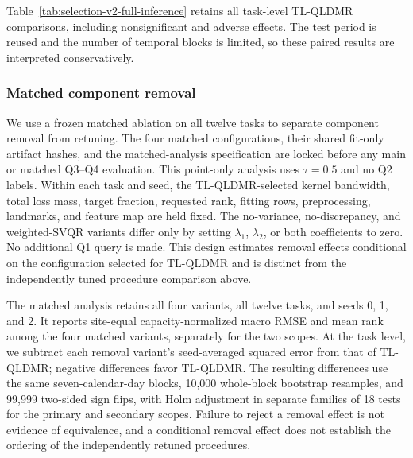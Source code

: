 {\color{blue}Table~\ref{tab:selection-v2-full-inference} retains all task-level TL-QLDMR comparisons, including nonsignificant and adverse effects. The test period is reused and the number of temporal blocks is limited, so these paired results are interpreted conservatively.}


\subsubsection{Matched component removal}
{\color{blue}We use a frozen matched ablation on all twelve tasks to separate component removal from retuning. The four matched configurations, their shared fit-only artifact hashes, and the matched-analysis specification are locked before any main or matched Q3--Q4 evaluation. This point-only analysis uses $\tau=0.5$ and no Q2 labels. Within each task and seed, the TL-QLDMR-selected kernel bandwidth, total loss mass, target fraction, requested rank, fitting rows, preprocessing, landmarks, and feature map are held fixed. The no-variance, no-discrepancy, and weighted-SVQR variants differ only by setting $\lambda_1$, $\lambda_2$, or both coefficients to zero. No additional Q1 query is made. This design estimates removal effects conditional on the configuration selected for TL-QLDMR and is distinct from the independently tuned procedure comparison above.}

{\color{blue}The matched analysis retains all four variants, all twelve tasks, and seeds 0, 1, and 2. It reports site-equal capacity-normalized macro RMSE and mean rank among the four matched variants, separately for the two scopes. At the task level, we subtract each removal variant's seed-averaged squared error from that of TL-QLDMR; negative differences favor TL-QLDMR. The resulting differences use the same seven-calendar-day blocks, 10,000 whole-block bootstrap resamples, and 99,999 two-sided sign flips, with Holm adjustment in separate families of 18 tests for the primary and secondary scopes. Failure to reject a removal effect is not evidence of equivalence, and a conditional removal effect does not establish the ordering of the independently retuned procedures.}



